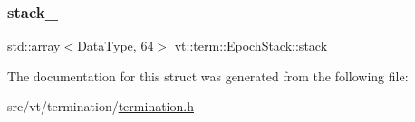 \mbox{\label{structvt_1_1term_1_1_epoch_stack_a6ba9e4683df356f409c8ba27f977a99a}} 
\subsubsection{\texorpdfstring{stack\+\_\+}{stack\_}}
{\footnotesize\ttfamily std\+::array$<$\hyperlink{structvt_1_1term_1_1_epoch_stack_a1c8546a8c68578c23ed96e65a778b5dc}{Data\+Type}, 64$>$ vt\+::term\+::\+Epoch\+Stack\+::stack\+\_\+}



The documentation for this struct was generated from the following file\+:\begin{DoxyCompactItemize}
\item 
src/vt/termination/\hyperlink{termination_8h}{termination.\+h}\end{DoxyCompactItemize}
